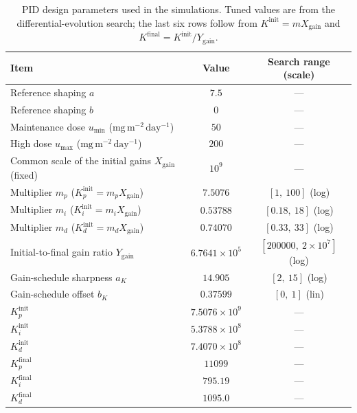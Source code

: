 \begin{table}[htbp]
\centering
\caption{PID design parameters used in the simulations. Tuned values are from the differential-evolution search; the last six rows follow from $K^{\mathrm{init}}=mX_{\mathrm{gain}}$ and $K^{\mathrm{final}}=K^{\mathrm{init}}/Y_{\mathrm{gain}}$.}
\label{tab:pid-params}
\small
\begin{tabular}{lcc}
\toprule
Item & Value & Search range (scale) \\
\midrule
Reference shaping $a$ & $7.5$ & --- \\
Reference shaping $b$ & $0$ & --- \\
Maintenance dose $u_{\min}$ ($\mathrm{mg\,m^{-2}\,day^{-1}}$) & $50$ & --- \\
High dose $u_{\max}$ ($\mathrm{mg\,m^{-2}\,day^{-1}}$) & $200$ & --- \\
Common scale of the initial gains $X_{\mathrm{gain}}$ (fixed) & $10^{9}$ & --- \\
Multiplier $m_p$ ($K_p^{\mathrm{init}}=m_pX_{\mathrm{gain}}$) & $7.5076$ & $[1,\ 100]$ (log) \\
Multiplier $m_i$ ($K_i^{\mathrm{init}}=m_iX_{\mathrm{gain}}$) & $0.53788$ & $[0.18,\ 18]$ (log) \\
Multiplier $m_d$ ($K_d^{\mathrm{init}}=m_dX_{\mathrm{gain}}$) & $0.74070$ & $[0.33,\ 33]$ (log) \\
Initial-to-final gain ratio $Y_{\mathrm{gain}}$ & $6.7641{\times}10^{5}$ & $[200000,\ 2{\times}10^{7}]$ (log) \\
Gain-schedule sharpness $a_K$ & $14.905$ & $[2,\ 15]$ (log) \\
Gain-schedule offset $b_K$ & $0.37599$ & $[0,\ 1]$ (lin) \\
$K_p^{\mathrm{init}}$ & $7.5076{\times}10^{9}$ & --- \\
$K_i^{\mathrm{init}}$ & $5.3788{\times}10^{8}$ & --- \\
$K_d^{\mathrm{init}}$ & $7.4070{\times}10^{8}$ & --- \\
$K_p^{\mathrm{final}}$ & $11099$ & --- \\
$K_i^{\mathrm{final}}$ & $795.19$ & --- \\
$K_d^{\mathrm{final}}$ & $1095.0$ & --- \\
\bottomrule
\end{tabular}
\end{table}
